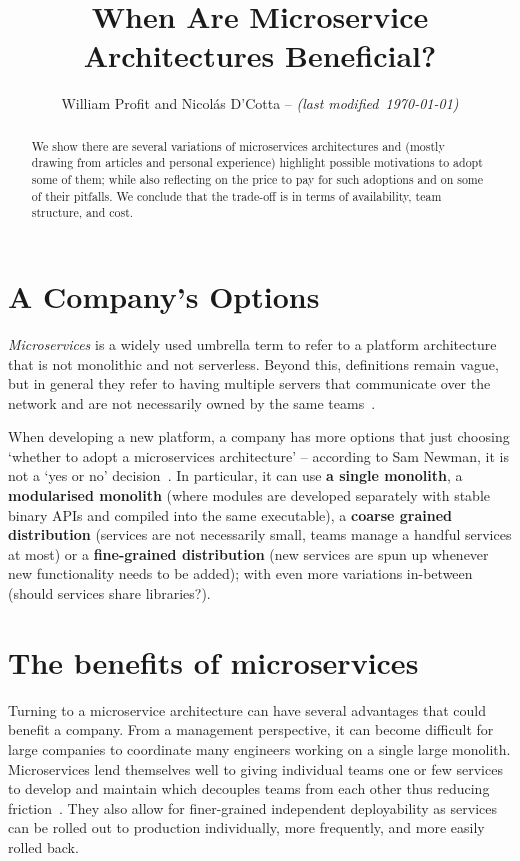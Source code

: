 \documentclass[conference]{IEEEtran}
\title{When Are Microservice Architectures Beneficial?}
\begin{document}
    \author{William Profit and Nicolás D'Cotta --
     \emph{(last modified~\today)}}

    \maketitle

    \begin{abstract}
        We show there are several variations of microservices architectures and (mostly drawing from articles and personal experience) highlight possible motivations to adopt
        some of them; while also reflecting on the price to pay for such adoptions and on some of
        their pitfalls. We conclude that the trade-off is in terms of availability, team structure, and cost.
    \end{abstract}


    \section{A Company's Options}

    \emph{Microservices} is a widely used umbrella term to refer to a platform architecture that is not monolithic and not serverless.
    Beyond this, definitions remain vague, but in general they refer to having multiple servers that communicate over the network and are not necessarily owned by the same teams~\cite{awsMicroServicesDef}.

    When developing a new platform, a company has more options that just choosing `whether to adopt a microservices architecture' -- according to Sam Newman, it is not a `yes or no' decision~\cite{microservicesNotBinary}.
    In particular, it can use \textbf{a single monolith}, a \textbf{modularised monolith} (where modules are developed separately with stable binary APIs and compiled into the same executable), a \textbf{coarse grained distribution} (services are not necessarily small, teams manage a handful services at most) or a
    \textbf{fine-grained distribution} (new services are spun up whenever new functionality needs to be added);
    with even more variations in-between (should services share libraries?).


    \section{The benefits of microservices}

    Turning to a microservice architecture can have several advantages that could benefit a company.
    From a management perspective, it can become difficult for large companies to coordinate many engineers working on a single large monolith.
    Microservices lend themselves well to giving individual teams one or few services to develop and maintain which decouples teams from each other thus reducing friction~\cite{awsTeamPart}.
    They also allow for finer-grained independent deployability as services can be rolled out to production individually, more frequently, and more easily rolled back.
\end{document}
